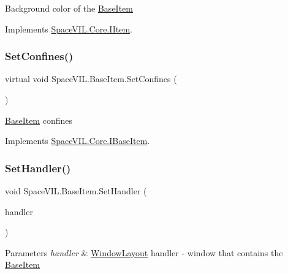 Background color of the \mbox{\hyperlink{class_space_v_i_l_1_1_base_item}{Base\+Item}} 



Implements \mbox{\hyperlink{interface_space_v_i_l_1_1_core_1_1_i_item}{Space\+V\+I\+L.\+Core.\+I\+Item}}.

\mbox{\label{class_space_v_i_l_1_1_base_item_abb2566ee1b68d0e415d003fcb252ca70}} 
\subsubsection{\texorpdfstring{Set\+Confines()}{SetConfines()}}
{\footnotesize\ttfamily virtual void Space\+V\+I\+L.\+Base\+Item.\+Set\+Confines (\begin{DoxyParamCaption}{ }\end{DoxyParamCaption})\hspace{0.3cm}{\ttfamily [virtual]}}



\mbox{\hyperlink{class_space_v_i_l_1_1_base_item}{Base\+Item}} confines 



Implements \mbox{\hyperlink{interface_space_v_i_l_1_1_core_1_1_i_base_item}{Space\+V\+I\+L.\+Core.\+I\+Base\+Item}}.

\mbox{\label{class_space_v_i_l_1_1_base_item_af62e189b018fffc486961909ab4671cb}} 
\subsubsection{\texorpdfstring{Set\+Handler()}{SetHandler()}}
{\footnotesize\ttfamily void Space\+V\+I\+L.\+Base\+Item.\+Set\+Handler (\begin{DoxyParamCaption}\item[{\mbox{\hyperlink{class_space_v_i_l_1_1_window_layout}{Window\+Layout}}}]{handler }\end{DoxyParamCaption})}


\begin{DoxyParams}{Parameters}
{\em handler} & \mbox{\hyperlink{class_space_v_i_l_1_1_window_layout}{Window\+Layout}} handler -\/ window that contains the \mbox{\hyperlink{class_space_v_i_l_1_1_base_item}{Base\+Item}} \\
\hline
\end{DoxyParams}


